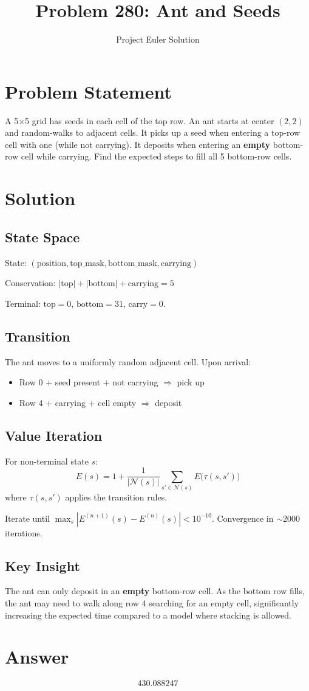 \documentclass[12pt]{article}
\title{Problem 280: Ant and Seeds}
\author{Project Euler Solution}
\date{}
\begin{document}
\maketitle

\section{Problem Statement}
A 5$\times$5 grid has seeds in each cell of the top row. An ant starts at center $(2,2)$ and random-walks to adjacent cells. It picks up a seed when entering a top-row cell with one (while not carrying). It deposits when entering an \textbf{empty} bottom-row cell while carrying. Find the expected steps to fill all 5 bottom-row cells.

\section{Solution}

\subsection{State Space}
State: $(\text{position}, \text{top\_mask}, \text{bottom\_mask}, \text{carrying})$

Conservation: $|\text{top}| + |\text{bottom}| + \text{carrying} = 5$

Terminal: $\text{top}=0$, $\text{bottom}=31$, $\text{carry}=0$.

\subsection{Transition}
The ant moves to a uniformly random adjacent cell. Upon arrival:
\begin{itemize}
    \item Row 0 + seed present + not carrying $\Rightarrow$ pick up
    \item Row 4 + carrying + cell empty $\Rightarrow$ deposit
\end{itemize}

\subsection{Value Iteration}
For non-terminal state $s$:
\[
E(s) = 1 + \frac{1}{|\mathcal{N}(s)|} \sum_{s' \in \mathcal{N}(s)} E\bigl(\tau(s, s')\bigr)
\]
where $\tau(s, s')$ applies the transition rules.

Iterate until $\max_s |E^{(n+1)}(s) - E^{(n)}(s)| < 10^{-10}$. Convergence in $\sim$2000 iterations.

\subsection{Key Insight}
The ant can only deposit in an \textbf{empty} bottom-row cell. As the bottom row fills, the ant may need to walk along row 4 searching for an empty cell, significantly increasing the expected time compared to a model where stacking is allowed.

\section{Answer}

\[
\boxed{430.088247}
\]
\end{document}
